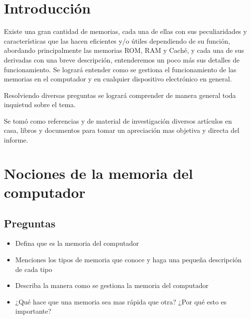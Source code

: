 \section{Introducción}


Existe una gran cantidad de memorias, cada una de ellas con sus peculiaridades y características que las hacen eficientes y/o útiles dependiendo de su función, abordando principalmente las memorias ROM, RAM y Caché, y cada una de sus derivadas con una breve descripción, entenderemos un poco más sus detalles de funcionamiento. Se logrará entender como se gestiona el funcionamiento de las memorias en el computador y en cualquier dispositivo electrónico en general.

Resolviendo diversas preguntas se logrará comprender de manera general toda inquietud sobre el tema. 

Se tomó como referencias y de material de investigación diversos artículos en casa, libros y documentos para tomar un apreciación mas objetiva y directa del informe. \cite{zamora} \cite{Agostini}

\newpage

\section{Nociones de la memoria del computador}
\subsection{Preguntas}
\begin{itemize}
    \item Defina que es la memoria del computador
    \item Menciones los tipos de memoria que conoce y haga una pequeña descripción de cada tipo
    \item Describa la manera como se gestiona la memoria del computador
    \item ¿Qué hace que una memoria sea mas rápida que otra? ¿Por qué esto es importante?
\end{itemize}

\newpage

